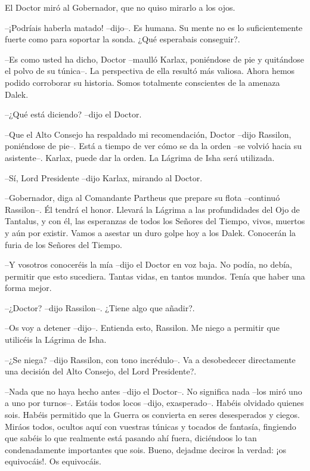 El Doctor miró al Gobernador, que no quiso mirarlo a los ojos. 

--¡Podríais haberla matado! --dijo--. Es humana. Su mente no es lo suficientemente fuerte como para soportar la sonda. ¿Qué esperabais conseguir?.

--Es como usted ha dicho, Doctor --maulló Karlax, poniéndose de pie y quitándose el polvo de su túnica--. La perspectiva de ella resultó más valiosa. Ahora hemos podido corroborar su historia. Somos totalmente conscientes de la amenaza Dalek.

--¿Qué está diciendo? --dijo el Doctor.

--Que el Alto Consejo ha respaldado mi recomendación, Doctor --dijo Rassilon, poniéndose de pie--. Está a tiempo de ver cómo se da la orden --se volvió hacia su asistente--. Karlax, puede dar la orden. La Lágrima de Isha será utilizada.

--Sí, Lord Presidente --dijo Karlax, mirando al Doctor.

--Gobernador, diga al Comandante Partheus que prepare su flota --continuó Rassilon--. Él tendrá el honor. Llevará la Lágrima a las profundidades del Ojo de Tantalus, y con él, las esperanzas de todos los Señores del Tiempo, vivos, muertos y aún por existir. Vamos a asestar un duro golpe hoy a los Dalek. Conocerán la furia de los Señores del Tiempo.

--Y vosotros conoceréis la mía --dijo el Doctor en voz baja. No podía, no debía, permitir que esto sucediera. Tantas vidas, en tantos mundos. Tenía que haber una forma mejor.

--¿Doctor? --dijo Rassilon--. ¿Tiene algo que añadir?.

--Os voy a detener --dijo--. Entienda esto, Rassilon. Me niego a permitir que utilicéis la Lágrima de Isha.

--¿Se niega? --dijo Rassilon, con tono incrédulo--. Va a desobedecer directamente una decisión del Alto Consejo, del Lord Presidente?.

--Nada que no haya hecho antes --dijo el Doctor--. No significa nada --los miró uno a uno por turnos--. Estáis todos locos --dijo, exasperado--. Habéis olvidado quienes sois. Habéis permitido que la Guerra os convierta en seres desesperados y ciegos. Miráos todos, ocultos aquí con vuestras túnicas y tocados de fantasía, fingiendo que sabéis lo que realmente está pasando ahí fuera, diciéndoos lo tan condenadamente importantes que sois. Bueno, dejadme deciros la verdad: ¡os equivocáis!. Os equivocáis.


